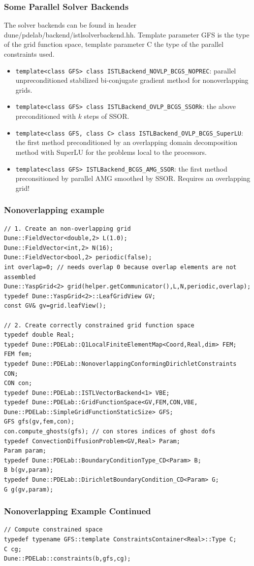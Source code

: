 {\begin{frame}
  \frametitle{Some Parallel Solver Backends}
  The solver backends can be found in header
  dune/pdelab/backend/istlsolverbackend.hh. Template parameter GFS is
  the type of the grid function space, template parameter C the type
  of the parallel constraints used.
  \begin{itemize}
  \item \lstinline!template<class GFS> class ISTLBackend_NOVLP_BCGS_NOPREC!:
    parallel unpreconditioned
    stabilized bi-conjugate gradient method for nonoverlapping grids.
    \item \lstinline!template<class GFS> class ISTLBackend_OVLP_BCGS_SSORk!:
      the above preconditioned with $k$ steps of SSOR.
    \item \lstinline!template<class GFS, class C> class ISTLBackend_OVLP_BCGS_SuperLU!:
      the first method preconditioned by an overlapping domain
      decomposition method with SuperLU for the problems local to the
      processors.
      \item \lstinline!template<class GFS> ISTLBackend_BCGS_AMG_SSOR!:
        the first method preconsitioned by parallel AMG smoothed by
        SSOR. Requires an overlapping grid!
  \end{itemize}
\end{frame}

\begin{frame}[fragile]
  \frametitle{Nonoverlapping example}
  \begin{lstlisting}[basicstyle=\tiny]
// 1. Create an non-overlapping grid
Dune::FieldVector<double,2> L(1.0);
Dune::FieldVector<int,2> N(16);
Dune::FieldVector<bool,2> periodic(false);
int overlap=0; // needs overlap 0 because overlap elements are not assembled
Dune::YaspGrid<2> grid(helper.getCommunicator(),L,N,periodic,overlap);
typedef Dune::YaspGrid<2>::LeafGridView GV;
const GV& gv=grid.leafView();

// 2. Create correctly constrained grid function space
typedef double Real;
typedef Dune::PDELab::Q1LocalFiniteElementMap<Coord,Real,dim> FEM;
FEM fem;
typedef Dune::PDELab::NonoverlappingConformingDirichletConstraints CON;
CON con;
typedef Dune::PDELab::ISTLVectorBackend<1> VBE;
typedef Dune::PDELab::GridFunctionSpace<GV,FEM,CON,VBE,
Dune::PDELab::SimpleGridFunctionStaticSize> GFS;
GFS gfs(gv,fem,con);
con.compute_ghosts(gfs); // con stores indices of ghost dofs
typedef ConvectionDiffusionProblem<GV,Real> Param;
Param param;
typedef Dune::PDELab::BoundaryConditionType_CD<Param> B;
B b(gv,param);
typedef Dune::PDELab::DirichletBoundaryCondition_CD<Param> G;
G g(gv,param);
\end{lstlisting}
\end{frame}
\begin{frame}[fragile]
\frametitle<presentation>{Nonoverlapping Example Continued}
  \begin{lstlisting}[basicstyle=\tiny]
// Compute constrained space
typedef typename GFS::template ConstraintsContainer<Real>::Type C;
C cg;
Dune::PDELab::constraints(b,gfs,cg);


\end{lstlisting}
\end{frame}}
